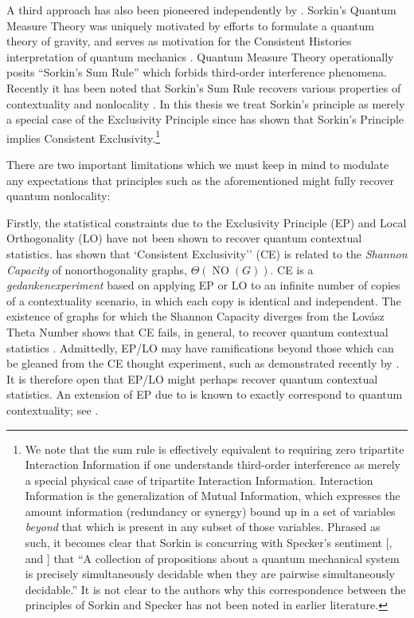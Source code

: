 \documentclass[
  12pt          %
  ,letterpaper  %
  ,center       %
  ,noupper      %
  ,english,fleqn]{uconnthesis}
\begin{document}
A third approach has also been pioneered independently by \citet{SorkinOriginal}. Sorkin's Quantum Measure Theory was uniquely motivated by efforts to formulate a quantum theory of gravity, and serves as motivation for the  Consistent Histories interpretation of quantum mechanics \cite{Sorkin94quantummeasure,HistoriesReviewDowker}. Quantum Measure Theory operationally posits ``Sorkin's Sum Rule'' which forbids third-order interference phenomena. Recently it has been noted that Sorkin's Sum Rule recovers various properties of contextuality and nonlocality \cite{AltSorkingQ1a,AltSorkingQ1b}. In this thesis we treat Sorkin's principle as merely a special case of the Exclusivity Principle since \citet{SorkinQ1} has shown that Sorkin's Principle implies Consistent Exclusivity.\footnote{We note that the sum rule is effectively equivalent to requiring zero tripartite Interaction Information \citep[Eq. (6)]{BellInteractionInformation} if one understands third-order interference as merely a special physical case of tripartite Interaction Information. Interaction Information is the generalization of Mutual Information, which expresses the amount information (redundancy or synergy) bound up in a set of variables \emph{beyond} that which is present in any subset of those variables. Phrased as such, it becomes clear that Sorkin is concurring with Specker's sentiment [\citealp{KSOriginal,EPSpecker,EPSpeckerVid,SeevinckSpeckerTranslation}, and \citealp[Sec. 7.1]{FritzCombinatorialLong}] that ``A collection of propositions about a quantum mechanical system is precisely simultaneously decidable when they are pairwise simultaneously decidable.'' It is not clear to the authors why this correspondence between the principles of Sorkin and Specker has not been noted in earlier literature.} 


There are two important limitations which we must keep in mind to modulate any expectations that principles such as the aforementioned might fully recover quantum nonlocality:

Firstly, the statistical constraints due to the Exclusivity Principle (EP) and Local Orthogonality (LO) have not been shown to recover quantum contextual statistics. \citet[Sec. 7.3]{FritzCombinatorialLong} has shown that `Consistent Exclusivity'' (CE) is related to the {\em Shannon Capacity} of nonorthogonality graphs, $\Theta{\left(\operatorname{NO}{\left(G\right)}\right)}$. CE is a \emph{gedankenexperiment} based on applying EP or LO to an infinite number of copies of a contextuality scenario, in which each copy is identical and independent. The existence of graphs for which the Shannon Capacity diverges from the Lov{\'a}sz Theta Number shows that CE fails, in general, to recover quantum contextual statistics \citep[Theorem 7.4.3]{FritzCombinatorialLong}. Admittedly, EP/LO may have ramifications beyond those which can be gleaned from the CE thought experiment, such as demonstrated recently by \citet{EPTsirelson}. It is therefore open that EP/LO might perhaps recover quantum contextual statistics. An extension of EP due to \citet{EPYan} is known to exactly correspond to quantum contextuality; see \citep[Theorem 7.7.2]{FritzCombinatorialLong}.
\end{document}
